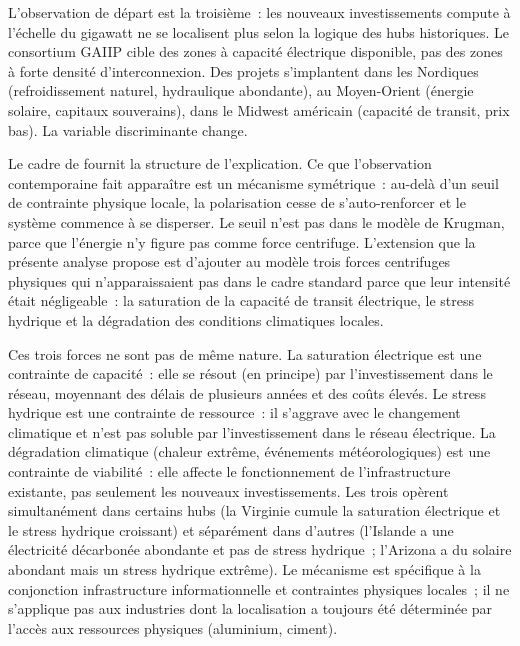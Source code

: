 \markNEO
L'observation de départ est la troisième~: les nouveaux investissements compute à l'échelle du gigawatt ne se localisent plus selon la logique des hubs historiques. Le consortium GAIIP cible des zones à capacité électrique disponible, pas des zones à forte densité d'interconnexion. Des projets s'implantent dans les Nordiques (refroidissement naturel, hydraulique abondante), au Moyen-Orient (énergie solaire, capitaux souverains), dans le Midwest américain (capacité de transit, prix bas). La variable discriminante change.

Le cadre de \textcite{krugman_increasing_1991} fournit la structure de l'explication.  Ce que l'observation contemporaine fait apparaître est un mécanisme symétrique~: au-delà d'un seuil de contrainte physique locale, la polarisation cesse de s'auto-renforcer et le système commence à se disperser. Le seuil n'est pas dans le modèle de Krugman, parce que l'énergie n'y figure pas comme force centrifuge. L'extension que la présente analyse propose est d'ajouter au modèle trois forces centrifuges physiques qui n'apparaissaient pas dans le cadre standard parce que leur intensité était négligeable~: la saturation de la capacité de transit électrique, le stress hydrique et la dégradation des conditions climatiques locales.

Ces trois forces ne sont pas de même nature. La saturation électrique est une contrainte de capacité~: elle se résout (en principe) par l'investissement dans le réseau, moyennant des délais de plusieurs années et des coûts élevés. Le stress hydrique est une contrainte de ressource~: il s'aggrave avec le changement climatique et n'est pas soluble par l'investissement dans le réseau électrique. La dégradation climatique (chaleur extrême, événements météorologiques) est une contrainte de viabilité~: elle affecte le fonctionnement de l'infrastructure existante, pas seulement les nouveaux investissements. Les trois opèrent simultanément dans certains hubs (la Virginie cumule la saturation électrique et le stress hydrique croissant) et séparément dans d'autres (l'Islande a une électricité décarbonée abondante et pas de stress hydrique~; l'Arizona a du solaire abondant mais un stress hydrique extrême). Le mécanisme est spécifique à la conjonction infrastructure informationnelle et contraintes physiques locales~; il ne s'applique pas aux industries dont la localisation a toujours été déterminée par l'accès aux ressources physiques (aluminium, ciment).

